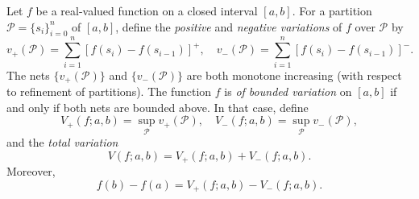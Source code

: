 Let $f$ be a real-valued function on a closed interval $[a, b]$. For a partition $\mathcal{P} = \{s_i\}_{i=0}^{n}$ of $[a, b]$, define the \textit{positive} and \textit{negative variations} of $f$ over $\mathcal{P}$ by
$$v_+(\mathcal{P}) = \sum_{i=1}^{n} [f(s_i) - f(s_{i-1})]^+, \quad v_-(\mathcal{P}) = \sum_{i=1}^{n} [f(s_i) - f(s_{i-1})]^-.$$
The nets $\{v_+(\mathcal{P})\}$ and $\{v_-(\mathcal{P})\}$ are both monotone increasing (with respect to refinement of partitions). The function $f$ is \textit{of bounded variation} on $[a, b]$ if and only if both nets are bounded above. In that case, define
$$V_+(f; a, b) = \sup_{\mathcal{P}} v_+(\mathcal{P}), \quad V_-(f; a, b) = \sup_{\mathcal{P}} v_-(\mathcal{P}),$$
and the \textit{total variation}
$$V(f; a, b) = V_+(f; a, b) + V_-(f; a, b).$$
Moreover,
$$f(b) - f(a) = V_+(f; a, b) - V_-(f; a, b).$$
